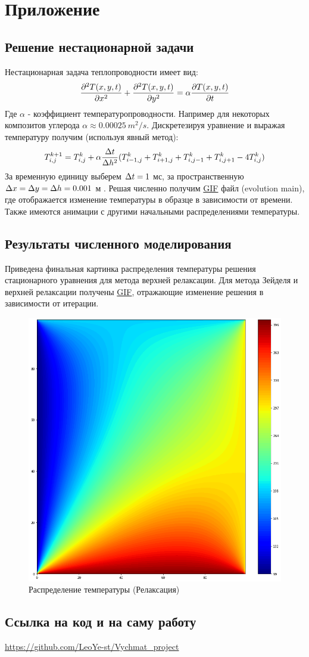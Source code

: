 \documentclass[20pt]{article}
\begin{document}
\section{Приложение}
\subsection{Решение нестационарной задачи}
Нестационарная задача теплопроводности имеет вид:
$$\frac{\partial ^2T(x,y,t)}{\partial x^2} + \frac{\partial ^2T(x,y,t)}{\partial y^2} =\alpha\* \frac{\partial T(x,y,t)}{\partial t}$$
Где $\alpha$ - коэффициент температуропроводности. Например для некоторых композитов углерода $\alpha \approx 0.00025\ m^{2}/s$.
Дискретезируя уравнение и выражая температуру получим (используя явный метод):
$$T^{k+1}_{i,j} = T^{k}_{i,j} + \alpha\*\frac{\Delta\*t}{\Delta\*h^{2}}\*( T^{k}_{i-1,j}+T^{k}_{i+1,j}+T^{k}_{i,j-1}+T^{k}_{i,j+1}-4\*T^{k}_{i,j})$$
За временную единицу выберем $\Delta\*t = 1\ $мс, за пространственную $\Delta\*x = \Delta\*y = \Delta\*h= 0.001\ $м . Решая численно получим \href{https://github.com/LeoYe-st/Vychmat_project}{GIF} файл (evolution main), где отображается изменение температуры в образце в зависимости от времени. Также имеются анимации с другими начальными распределениями температуры.
\subsection{Результаты численного моделирования}
Приведена финальная картинка распределения температуры решения стационарного уравнения для метода верхней релаксации. Для метода Зейделя и верхней релаксации получены \href{https://github.com/LeoYe-st/Vychmat_project}{GIF}, отражающие изменение решения в зависимости от итерации.
\begin{figure}[h!]
        \centering
        \includegraphics[width=132mm]{final.png}
        \caption{Распределение температуры (Релаксация)}
        \label{setup}
    \end{figure}
\subsection{Ссылка на код и на саму работу}
\url{https://github.com/LeoYe-st/Vychmat_project}
\end{document}
